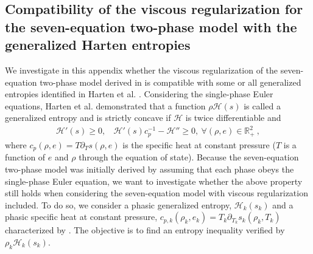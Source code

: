 \begin{appendices}
%
\section{Compatibility of the viscous regularization for the seven-equation two-phase model with the generalized Harten entropies}\label{app:harden}
%
We investigate in this appendix whether the viscous regularization of the seven-equation two-phase model derived in  is compatible with some or all generalized entropies identified in Harten et al. \cite{Harten}. Considering the single-phase Euler equations, Harten et al. \cite{Harten} demonstrated that a function $\rho \mathscr{H}(s)$ is called a generalized entropy and is strictly concave if $\mathscr{H}$ is twice differentiable and
%
\begin{multline}\label{eq:generalized_ent}
\mathscr{H}' (s)  \geq 0, \ \ \ \ \mathscr{H}'(s)c_p^{-1} - \mathscr{H}'' \geq 0, \ \forall \left( \rho, e \right) \in \mathbb{R}_+^2 \ ,
\end{multline}
%
where $c_p \left( \rho, e \right) = T \partial_T s \left( \rho, e \right)$ is the specific heat at constant pressure ($T$ is a function of $e$ and $\rho$ through the equation of state). Because the seven-equation two-phase model was initially derived by assuming that each phase obeys the single-phase Euler equation, we want to investigate whether the above property still holds when considering the seven-equation model with viscous regularization included. To do so, we consider a phasic generalized entropy, $\mathscr{H}_k(s_k)$ and a phasic specific heat at constant pressure, $c_{p,k} \left( \rho_k, e_k \right) = T_k \partial_{T_k} s_k \left( \rho_k, T_k \right)$ characterized by . The objective is to find an entropy inequality verified by $\rho_k \mathscr{H}_k(s_k)$.


\end{appendices}

